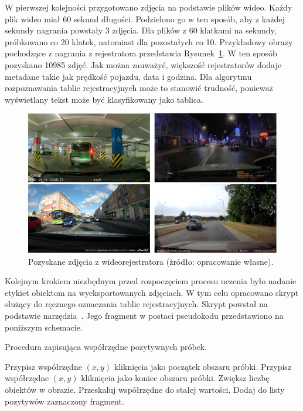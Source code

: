 W pierwszej kolejności przygotowano zdjęcia na podstawie plików wideo.
Każdy plik wideo miał 60 sekund długości.
Podzielono go w ten sposób, aby z każdej sekundy nagrania powstały 3 zdjęcia.
Dla plików z 60 klatkami na sekundy, próbkowano co 20 klatek, natomiast dla pozostałych co 10.
Przykładowy obrazy pochodzące z nagrania z rejestratora przedstawia Rysunek~\ref{fig:captured_frame}.
W ten sposób pozyskano 10985 zdjęć.
Jak można zauważyć, większość rejestratorów dodaje metadane takie jak prędkość pojazdu, data i godzina.
Dla algorytmu rozpoznawania tablic rejestracyjnych może to stanowić trudność, ponieważ wyświetlany tekst może być klasyfikowany jako tablica.
\begin{figure}[!ht]
    \centering
    \includegraphics[scale=0.4]{Pictures/captured_frames}
    \caption{Pozyskane zdjęcia z wideorejestratora (źródło: opracowanie własne).}
    \label{fig:captured_frame}
\end{figure}
\FloatBarrier

Kolejnym krokiem niezbędnym przed rozpoczęciem procesu uczenia było nadanie etykiet obiektom na wyeksportowanych zdjęciach.
W tym celu opracowano skrypt służący do ręcznego oznaczania tablic rejestracyjnych.
Skrypt powstał na podstawie narzędzia~\cite{haar_object_marker}.
Jego fragment w postaci pseudokodu przedstawiono na poniższym schemacie.
\begin{algorithm}
    \caption{Procedura zapisująca współrzędne pozytywnych próbek.}
    \begin{algorithmic}[1]
        \label{create_positives}
                    \State Przypisz współrzędne $(x,y)$ kliknięcia jako początek obszaru próbki.
                \Else
                    \State Przypisz współrzędne $(x,y)$ kliknięcia jako koniec obszaru próbki.
                    \State Zwiększ liczbę obiektów w obrazie.
                    \State Przeskaluj współrzędne do stałej wartości.
                    \State Dodaj do listy pozytywów zaznaczony fragment.
                \EndIf
            \EndIf
        \EndProcedure
    \end{algorithmic}
\end{algorithm}
\FloatBarrier


